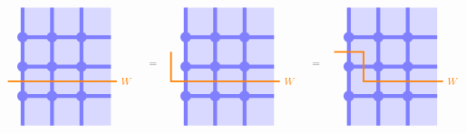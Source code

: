 \documentclass[report,paper=a4, fontsize=12pt, line_length=16cm, number_of_lines=33,dvipdfmx]{jlreq}
\numberwithin{equation}{chapter}
\begin{document}
\begin{align}
    \begin{tikzpicture}[baseline=0cm]
        \foreach \x in {0,1,2}{
            \foreach \y in {-2,-1,...,1}{
            \fill[plaqblue](\x,\y) rectangle (\x+1,\y+1);
            }
        }
        \foreach \x in {0,1,2}{
            \foreach \y in {-1,0,1}{
                \fill[linkblue] (\x,\y) circle (1.8mm);
            }
        }
        \foreach \x in {0,1,2}{
            \foreach \y in {-1,0,1}{
                \draw[linkblue, line width = 1.3mm](\x,\y)--(\x + 1,\y);
            }
        }
        \foreach \x in {0,1,2}{
            \foreach \y in {-2,-1,...,1}{
                \draw[linkblue, line width = 1.3mm](\x,\y)--(\x,\y + 1);
            }
        }
        \draw[red!50!yellow, ultra thick](-0.5,-0.5)--(3.2,-0.5) node[right]{$W$};
    \end{tikzpicture}
    \quad
    =\quad
    \begin{tikzpicture}[baseline=0cm]
        \foreach \x in {0,1,2}{
            \foreach \y in {-2,-1,...,1}{
            \fill[plaqblue](\x,\y) rectangle (\x+1,\y+1);
            }
        }
        \foreach \x in {0,1,2}{
            \foreach \y in {-1,0,1}{
                \fill[linkblue] (\x,\y) circle (1.8mm);
            }
        }
        \foreach \x in {0,1,2}{
            \foreach \y in {-1,0,1}{
                \draw[linkblue, line width = 1.3mm](\x,\y)--(\x + 1,\y);
            }
        }
        \foreach \x in {0,1,2}{
            \foreach \y in {-2,-1,...,1}{
                \draw[linkblue, line width = 1.3mm](\x,\y)--(\x,\y + 1);
            }
        }
        \draw[red!50!yellow, ultra thick](-0.5, 0.5)--(-0.5,-0.5)--(3.2,-0.5) node[right]{$W$};
    \end{tikzpicture}
    \quad
    =\quad
    \begin{tikzpicture}[baseline=0cm]
        \foreach \x in {0,1,2}{
            \foreach \y in {-2,-1,...,1}{
            \fill[plaqblue](\x,\y) rectangle (\x+1,\y+1);
            }
        }
        \foreach \x in {0,1,2}{
            \foreach \y in {-1,0,1}{
                \fill[linkblue] (\x,\y) circle (1.8mm);
            }
        }
        \foreach \x in {0,1,2}{
            \foreach \y in {-1,0,1}{
                \draw[linkblue, line width = 1.3mm](\x,\y)--(\x + 1,\y);
            }
        }
        \foreach \x in {0,1,2}{
            \foreach \y in {-2,-1,...,1}{
                \draw[linkblue, line width = 1.3mm](\x,\y)--(\x,\y + 1);
            }
        }
        \draw[red!50!yellow, ultra thick](-0.5, 0.5)--(0.5, 0.5)--(0.5,-0.5)--(3.2,-0.5) node[right]{$W$};
    \end{tikzpicture}
\end{align}
\end{document}
